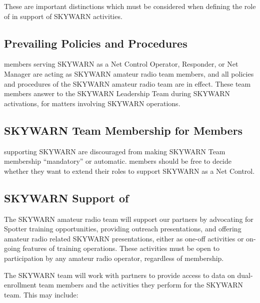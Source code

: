 \documentclass[pdflatex,letterpaper,twoside,12pt]{book}
\begin{document}
These are important distinctions which must be considered when defining the role of \tpteams in support of SKYWARN activities.

\subsection{Prevailing Policies and Procedures}

\tpteam members serving SKYWARN as a Net Control Operator, Responder, or Net Manager are acting as SKYWARN amateur radio team members, and all policies and procedures of the SKYWARN amateur radio team are in effect.  These team members answer to the SKYWARN Leadership Team during SKYWARN activations, for matters involving SKYWARN operations.


\subsection{SKYWARN Team Membership for \tpteam Members}

\tpteams supporting SKYWARN are discouraged from making SKYWARN Team membership ``mandatory'' or automatic.  \tpteam members should be free to decide whether they want to extend their roles to support SKYWARN as a Net Control.


\subsection{SKYWARN Support of \tpteams}

The SKYWARN amateur radio team will support our \tpteam partners by advocating for Spotter training opportunities, providing outreach presentations, and offering amateur radio related SKYWARN presentations, either as one-off activities or on-going features of \tpteam training operations.  These activities must be open to participation by any amateur radio operator, regardless of \tpteam membership.

The SKYWARN team will work with \tpteam partners to provide access to data on dual-enrollment team members and the activities they perform for the SKYWARN team.  This may include:
\end{document}
